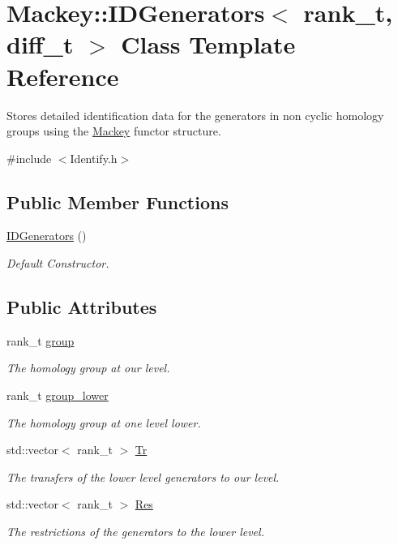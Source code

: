 \hypertarget{classMackey_1_1IDGenerators}{}\section{Mackey\+:\+:I\+D\+Generators$<$ rank\+\_\+t, diff\+\_\+t $>$ Class Template Reference}
\label{classMackey_1_1IDGenerators}


Stores detailed identification data for the generators in non cyclic homology groups using the \hyperlink{namespaceMackey}{Mackey} functor structure.  




{\ttfamily \#include $<$Identify.\+h$>$}

\subsection*{Public Member Functions}
\begin{DoxyCompactItemize}
\item 
\hyperlink{classMackey_1_1IDGenerators_a2f7d0d382aca772c12e27a3c65510643}{I\+D\+Generators} ()
\begin{DoxyCompactList}\small\item\em Default Constructor. \end{DoxyCompactList}\end{DoxyCompactItemize}
\subsection*{Public Attributes}
\begin{DoxyCompactItemize}
\item 
rank\+\_\+t \hyperlink{classMackey_1_1IDGenerators_ad9fd855102a6663a9d7b3c93dc9c369d}{group}
\begin{DoxyCompactList}\small\item\em The homology group at our level. \end{DoxyCompactList}\item 
rank\+\_\+t \hyperlink{classMackey_1_1IDGenerators_a6eb50f39a23356d50461163e578e23a4}{group\+\_\+lower}
\begin{DoxyCompactList}\small\item\em The homology group at one level lower. \end{DoxyCompactList}\item 
std\+::vector$<$ rank\+\_\+t $>$ \hyperlink{classMackey_1_1IDGenerators_a5dd4d24cfe493da4522198f03d32f078}{Tr}
\begin{DoxyCompactList}\small\item\em The transfers of the lower level generators to our level. \end{DoxyCompactList}\item 
std\+::vector$<$ rank\+\_\+t $>$ \hyperlink{classMackey_1_1IDGenerators_a10ddb834467f6b1471375542a73d8e6f}{Res}
\begin{DoxyCompactList}\small\item\em The restrictions of the generators to the lower level. \end{DoxyCompactList}\end{DoxyCompactItemize}


